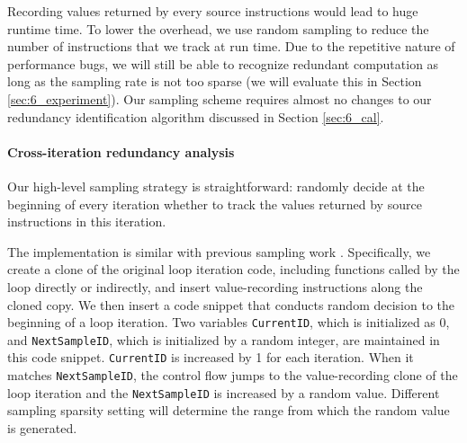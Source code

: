 
Recording values returned by every source instructions would lead to 
huge runtime time. To lower the overhead,
we use random sampling to reduce the number of instructions that we
track at run time. Due to the repetitive nature of performance bugs,
we will still be able to recognize redundant 
computation as long as the sampling rate is not too sparse (we will evaluate
this in Section \ref{sec:6_experiment}). 
Our sampling scheme requires almost no changes to our redundancy 
identification algorithm discussed in Section \ref{sec:6_cal}.




\paragraph{Cross-iteration redundancy analysis}
Our high-level sampling strategy is straightforward:
randomly decide at the
beginning of every iteration whether to track the values returned by
source instructions in this iteration.

The implementation is similar with previous sampling work 
\citep{liblit03,liblit05}.
Specifically, we create a clone of the original
loop iteration code, including functions called by the loop directly or
indirectly, and insert value-recording instructions along the
cloned copy. 
We then insert a code snippet that conducts random decision to
the beginning of a loop iteration. 
Two variables \texttt{CurrentID}, which is initialized as 0, 
and \texttt{NextSampleID}, which is initialized by a random integer, 
are maintained
in this code snippet. \texttt{CurrentID} is increased by 1
for each iteration. When it matches \texttt{NextSampleID}, the control
flow jumps to the value-recording clone of the loop iteration and the 
\texttt{NextSampleID} is increased by a random value. Different sampling
sparsity setting will determine the range from which the random value is
generated.

